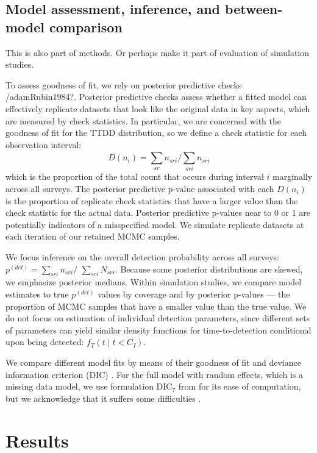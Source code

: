 \documentclass[useAMS,usenatbib,referee,12pt]{article}
\newcommand{\jarad}[1]{{\color{red} #1}}
\begin{document}
\subsection{Model assessment, inference, and between-model comparison}

\jarad{This is also part of methods. Or perhaps make it part of evaluation of simulation studies.}

To assess goodness of fit, we rely on posterior predictive checks \citep{Gelman1996}/adam{Rubin1984?}.  Posterior predictive checks assess whether a fitted model can effectively replicate datasets that look like the original data in key aspects, which are measured by check statistics.  In particular, we are concerned with the goodness of fit for the TTDD distribution, so we define a check statistic for each observation interval:
\[D(n_i) = \sum\limits_{sr} n_{sri} \big/ \sum\limits_{sri}^{} n_{sri}\]
which is the proportion of the total count that occurs during interval $i$ marginally across all surveys.  The posterior predictive p-value associated with each $D(n_i)$ is the proportion of replicate check statistics that have a larger value than the check statistic for the actual data.  Posterior predictive p-values near to 0 or 1 are potentially indicators of a misspecified model.  We simulate replicate datasets at each iteration of our retained MCMC samples.

We focus inference on the overall detection probability across all surveys: $p^{(det)} = \sum\limits_{sri}n_{sri}\big/$ $\sum\limits_{sri}N_{sri}$.  Because some posterior distributions are skewed, we emphasize posterior medians.  Within simulation studies, we compare model estimates to true $p^{(det)}$ values by coverage and by posterior p-values --- the proportion of MCMC samples that have a smaller value than the true value.  We do not focus on estimation of individual detection parameters, since different sets of parameters can yield similar density functions for time-to-detection conditional upon being detected: $f_T(t\;|\;t<C_I)$.

We compare different model fits by means of their goodness of fit and deviance information criterion (DIC) \citep{Spiegelhalter2002}.  For the full model with random effects, which is a missing data model, we use formulation DIC$_7$ from \citet{Celeux2006} for its ease of computation, but we acknowledge that it suffers some difficulties \citep{Celeux2006, Li2014}.




\section{Results}\label{sec:results}
\end{document}
